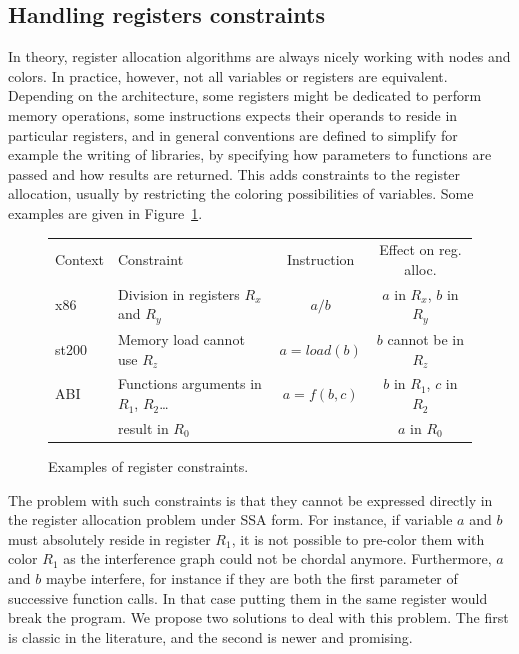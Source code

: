 {\subsection{Handling registers constraints}

In theory, register allocation algorithms are always nicely working with nodes 
and colors. In practice, however, not all variables or registers are 
equivalent. Depending on the architecture, some registers might be dedicated 
to perform memory operations, some instructions expects their operands to 
reside in particular registers, and in general conventions are defined to 
simplify for example the writing of libraries, by specifying how parameters to 
functions are passed and how results are returned. This adds constraints to the 
register allocation, usually by restricting the coloring possibilities of 
variables. Some examples are given in Figure~\ref{fig:reg-constraints}.

\begin{figure}
  \begin{center}
    \begin{tabular}{llcc}
    Context & Constraint  & Instruction & Effect on reg. alloc. \\
    x86 & Division in registers $R_x$ and $R_y$ & $a / b$ & $a$ in $R_x$, $b$ in $R_y$\\
    st200 & Memory load cannot use $R_z$ & $a = load(b)$ & $b$ cannot be in $R_z$\\
    ABI & Functions arguments in $R_1$, $R_2$\ldots & $a = f(b,c)$ & $b$ in $R_1$, $c$ in $R_2$ \\
     & result in $R_0$ & & $a$ in $R_0$\\
  \end{tabular}
  \end{center}
  \caption{Examples of register constraints.}
  \label{fig:reg-constraints}
\end{figure}


The problem with such constraints is that they cannot be expressed directly in 
the register allocation problem under SSA form. For instance, if variable $a$ and $b$ must 
absolutely reside in register $R_1$, it is not possible to pre-color them with 
color $R_1$ as the interference graph could not be chordal anymore.  
Furthermore, $a$ and $b$ maybe interfere, for instance if they are both the 
first parameter of successive function calls. In that case putting them in the 
same register would break the program. We propose two solutions 
to deal with this problem. The first is classic in the literature, and the 
second is newer and promising.


}
